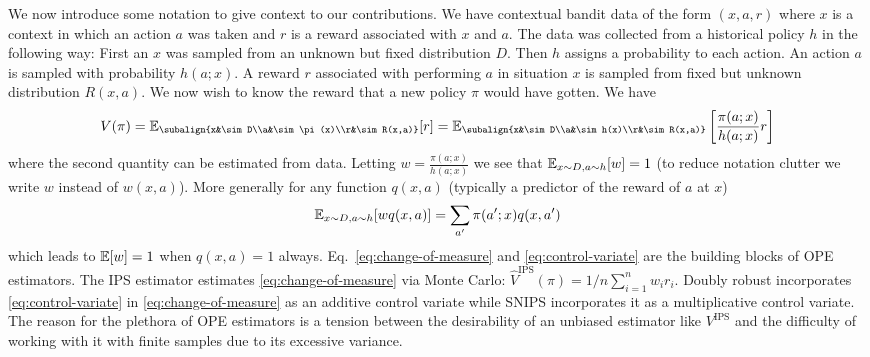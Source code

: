 We now introduce some notation to give 
context to our contributions.
We have contextual bandit data of the form $(x,a,r)$
where $x$ is a context in which an action $a$ was taken 
and $r$ is a reward associated with $x$ and $a$. 
The data was collected from a historical policy $h$ in the following way:
First an $x$ was sampled from an unknown but fixed distribution $D$. 
Then $h$ assigns a probability to each action. 
An action $a$ is sampled with probability $h(a;x)$.
A reward $r$ associated with performing $a$ in
situation $x$ is sampled from fixed but unknown distribution $R(x,a)$. 
We now wish to know the reward that a new policy $\pi$
would have gotten. We have
\begin{equation}
\label{eq:change-of-measure}
V(\pi) = \E_{\subalign{x&\sim D\\a&\sim\pi(x)\\r&\sim R(x,a)}}[r]
=
\E_{\subalign{x&\sim D\\a&\sim h(x)\\r&\sim R(x,a)}}\left[\frac{\pi(a;x)}{h(a;x)}r\right]
\end{equation}
where the second quantity can be estimated from data. 
Letting $w=\frac{\pi(a;x)}{h(a;x)}$  we see that 
$\mathbb{E}_{x\sim D,a\sim h}[w]=1$
(to reduce notation 
clutter we write $w$ instead of $w(x,a)$). More generally 
for any function $q(x,a)$ (typically
a predictor of the reward of $a$ at $x$)
\begin{equation}
\label{eq:control-variate}
\mathbb{E}_{x\sim D,a\sim h}[w q(x,a)] = \sum_{a'} \pi(a';x) q(x,a')    
\end{equation}
which leads to $\mathbb{E}[w]=1$ when $q(x,a)=1$ always. Eq.~\eqref{eq:change-of-measure} and \eqref{eq:control-variate}
are the building blocks of OPE estimators. 
The IPS estimator \cite{...} estimates
\eqref{eq:change-of-measure} via Monte Carlo: $\hat{V}^{\textrm{IPS}}(\pi) = 1/n \sum_{i=1}^n w_i r_i $.
Doubly robust \cite{...} incorporates \eqref{eq:control-variate}
in \eqref{eq:change-of-measure} as an additive control variate
while SNIPS \cite{...} incorporates it as a multiplicative
control variate. The reason for the plethora of OPE estimators 
is a tension between the desirability of an unbiased estimator
like $V^{\textrm{IPS}}$ and the difficulty of working with it
with finite samples due to its excessive variance.

